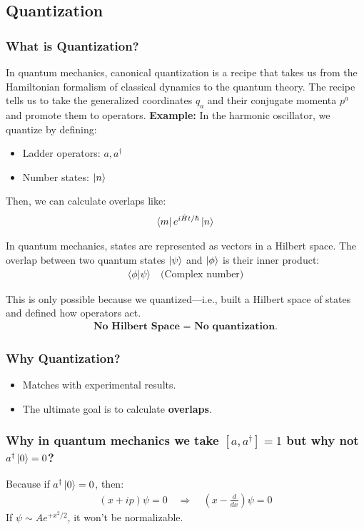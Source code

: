 \documentclass[14pt]{article} %
\begin{document}
\subsection{Quantization}
\subsubsection*{What is Quantization?}
In quantum mechanics, canonical quantization is a recipe that takes us from the Hamiltonian formalism of classical dynamics to the quantum theory. The recipe tells us to
take the generalized coordinates $q_a$ and their conjugate momenta $p^a$ and promote them to operators. 
\newline
\textbf{Example:} In the harmonic oscillator, we quantize by defining:
\begin{itemize}
    \item Ladder operators: \( a, a^\dagger \)
    \item Number states: \( \ket{n} \)
\end{itemize}

Then, we can calculate overlaps like:
\begin{align*}
\bra{m} e^{i\hat{H}t/\hbar} \ket{n}
\end{align*}
\begin{tcolorbox}[ title=Overlaps]
In quantum mechanics, states are represented as vectors in a Hilbert space. The overlap between two quantum states \( \ket{\psi} \) and \( \ket{\phi} \) is their inner product:
\begin{align*}
\langle{\phi|\psi}\rangle \quad \text{(Complex number)}
\end{align*}
\end{tcolorbox}
This is only possible because we quantized—i.e., built a Hilbert space of states and defined how operators act.
\begin{align*}
\boxed{\textbf{No Hilbert Space = No quantization.}}
\end{align*}

\subsubsection*{Why Quantization?}
\begin{itemize}
    \item Matches with experimental results.
    \item The ultimate goal is to calculate \textbf{overlaps}. %
\end{itemize}
\vspace{1cm}
\begin{tcolorbox}[ title=Note]
\subsubsection*{Why in quantum mechanics we take \( [a, a^\dagger] = 1 \) but why not \( a^\dagger \ket{0} = 0 \)?}
Because if \( a^\dagger \ket{0} = 0 \), then:
\begin{align*}
(x + ip) \psi = 0 \quad \Rightarrow \quad \left( x - \frac{d}{dx} \right) \psi = 0
\end{align*}
If \( \psi \sim A e^{+x^2/2} \), it won't be normalizable.
\end{tcolorbox}
\end{document}

